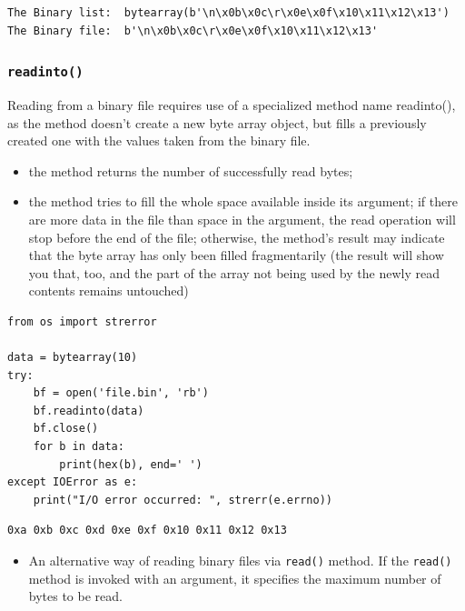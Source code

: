 \documentclass[11pt]{article}
\begin{document}
\begin{verbatim}
The Binary list:  bytearray(b'\n\x0b\x0c\r\x0e\x0f\x10\x11\x12\x13')
The Binary file:  b'\n\x0b\x0c\r\x0e\x0f\x10\x11\x12\x13'
\end{verbatim}

\subsubsection{\texttt{readinto()}}
\label{sec:orgf18140e}
Reading from a binary file requires use of a specialized method name
readinto(), as the method doesn’t create a new byte array object, but
fills a previously created one with the values taken from the binary
file.

\begin{itemize}
\item the method returns the number of successfully read bytes;

\item the method tries to fill the whole space available inside its
argument; if there are more data in the file than space in the
argument, the read operation will stop before the end of the file;
otherwise, the method’s result may indicate that the byte array has
only been filled fragmentarily (the result will show you that, too,
and the part of the array not being used by the newly read contents
remains untouched)
\end{itemize}

\begin{verbatim}
from os import strerror

data = bytearray(10)
try:
	bf = open('file.bin', 'rb')
	bf.readinto(data)
	bf.close()
	for b in data:
		print(hex(b), end=' ')
except IOError as e:
	print("I/O error occurred: ", strerr(e.errno))
\end{verbatim}

\begin{verbatim}
0xa 0xb 0xc 0xd 0xe 0xf 0x10 0x11 0x12 0x13 
\end{verbatim}

\vspace{10 mm}

\begin{itemize}
\item An alternative way of reading binary files via \texttt{read()} method. If
the \texttt{read()} method is invoked with an argument, it specifies the
maximum number of bytes to be read.
\end{itemize}
\end{document}
